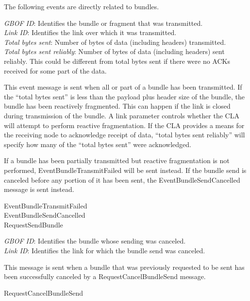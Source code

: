 The following events are directly related to bundles.\\[1em]

{
\metP
    {\em GBOF ID}: Identifies the bundle or fragment that was transmitted.\\
    {\em Link ID}: Identifies the link over which it was transmitted.\\
    {\em Total bytes sent}: Number of bytes of data (including headers)
    transmitted.\\
    {\em Total bytes sent reliably}: Number of bytes of data (including
    headers) sent reliably. This could be different from total bytes sent
    if there were no ACKs received for some part of the data.

\metD
    This event message is sent when all or part of a bundle has been
    transmitted. If the ``total bytes sent'' is less than the payload plus
    header size of the bundle, the bundle has been reactively fragmented. This
    can happen if the link is closed during transmission of the bundle. A
    link parameter controls whether the CLA will attempt to perform reactive
    fragmentation. If the CLA provides a means for the receiving node to
    acknowledge receipt of data, ``total bytes sent reliably'' will specify how
    many of the ``total bytes sent'' were acknowledged.

    If a bundle has been partially transmitted but reactive fragmentation is
    not performed, EventBundleTransmitFailed will be sent instead. If the
    bundle send is canceled before any portion of it has been sent, the
    EventBundleSendCancelled message is sent instead.

\metR
    EventBundleTransmitFailed\\
    EventBundleSendCancelled\\
    RequestSendBundle
}

{
\metP
    {\em GBOF ID}: Identifies the bundle whose sending was canceled.\\
    {\em Link ID}: Identifies the link for which the bundle send was
    canceled.

\metD
    This message is sent when a bundle that was previously requested to be
    sent has been successfully canceled by a RequestCancelBundleSend
    message.

\metR
    RequestCancelBundleSend
}

